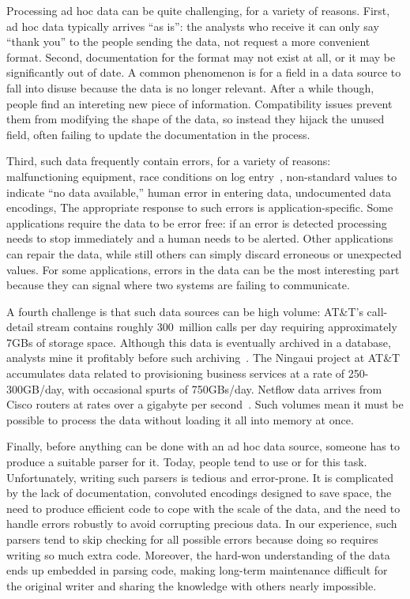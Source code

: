 \documentclass{sig-alternate}
\begin{document}
Processing ad hoc data can be quite challenging, for a variety of
reasons. First, ad hoc data typically arrives ``as is'': the analysts
who receive it can only say ``thank you'' to the people sending the
data, not request a more convenient format. 
Second, documentation for the format may not exist at all, or it may be
significantly out of date.  A common phenomenon is for a field in a
data source to fall into disuse because the data is no longer
relevant.  After a while though, people find an intereting new piece of
information.  Compatibility issues prevent them from modifying the
shape of the data, so instead they hijack the unused field, often
failing to update the documentation in the process.

Third, such data frequently contain errors, for a variety of
reasons: malfunctioning equipment, race conditions on log
entry~\cite{wpp}, non-standard values to indicate ``no data
available,'' human error in entering data, undocumented data
encodings, \etc{} The appropriate response to such errors is
application-specific. Some applications require the data to be error free: 
if an error is detected processing needs to stop immediately and a human
needs to be alerted.  Other applications can repair the data, while still
others can simply discard erroneous or unexpected values.  
For some applications,
errors in the data can be the most interesting part  because
they can signal where two systems are failing to communicate.

A fourth challenge is that such data sources can be high volume:
AT\&T's call-detail stream contains roughly 300~million calls per day
requiring approximately 7GBs of storage space. Although this data is
eventually archived in a database, analysts mine it profitably before
such archiving~\cite{kdd98,kdd99}. The Ningaui project at AT\&T
accumulates data related to provisioning business services at a rate
of 250-300GB/day, with occasional spurts of 750GBs/day.  Netflow data
arrives from Cisco routers at rates over a gigabyte per
second~\cite{gigascope}. Such volumes mean it must be possible to
process the data without loading it all into memory at once.

Finally, before anything can be done with an ad hoc data source,
someone has to produce a suitable parser for it.
Today, people tend to use \C{} or \perl{} for this task.
Unfortunately, writing
such parsers is tedious and error-prone. It is complicated by the lack
of documentation, convoluted encodings designed to save space, 
the need to produce efficient code to cope with the scale of the data,
and the need to handle errors robustly to avoid corrupting precious data.
In our experience, 
such parsers tend to skip checking for all possible errors
because doing so requires writing so much extra code. 
Moreover, the hard-won understanding of the data
ends up embedded in parsing code, making long-term maintenance
difficult for the original writer and sharing the knowledge with
others nearly impossible.
\end{document}
